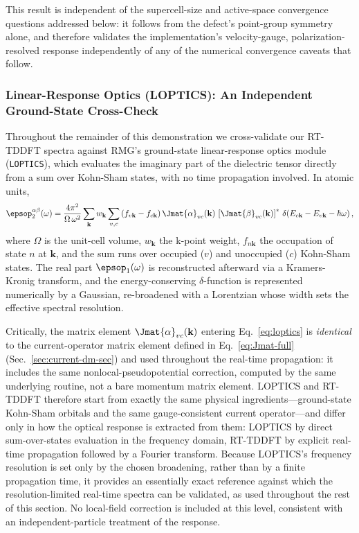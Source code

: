 This result is independent of the supercell-size and active-space
convergence questions addressed below: it follows from the defect's
point-group symmetry alone, and therefore validates the
implementation's velocity-gauge, polarization-resolved response
independently of any of the numerical convergence caveats that follow.

\subsubsection{Linear-Response Optics (LOPTICS): An Independent Ground-State Cross-Check}
\label{sec:nv-loptics}

Throughout the remainder of this demonstration we cross-validate our
RT-TDDFT spectra against RMG's ground-state linear-response optics
module (\texttt{LOPTICS}), which evaluates the imaginary part of the
dielectric tensor directly from a sum over Kohn-Sham states, with no
time propagation involved. In atomic units,
\begin{equation}
  \epsop_2^{\alpha\beta}(\omega) =
  \frac{4\pi^2}{\Omega\,\omega^2}
  \sum_{\mathbf{k}} w_{\mathbf{k}}
  \sum_{v,c}
  \left(f_{v\mathbf{k}} - f_{c\mathbf{k}}\right)
  \Jmat{\alpha}_{vc}(\mathbf{k})\,
  \left[\Jmat{\beta}_{vc}(\mathbf{k})\right]^{*}
  \,\delta\!\left(E_{c\mathbf{k}} - E_{v\mathbf{k}} - \hbar\omega\right),
  \label{eq:loptics}
\end{equation}
where $\Omega$ is the unit-cell volume, $w_{\mathbf{k}}$ the k-point
weight, $f_{n\mathbf{k}}$ the occupation of state $n$ at $\mathbf{k}$,
and the sum runs over occupied ($v$) and unoccupied ($c$) Kohn-Sham
states. The real part $\epsop_1(\omega)$ is reconstructed afterward via
a Kramers-Kronig transform, and the energy-conserving $\delta$-function
is represented numerically by a Gaussian, re-broadened with a
Lorentzian whose width sets the effective spectral resolution.

Critically, the matrix element $\Jmat{\alpha}_{vc}(\mathbf{k})$ entering
Eq.~\eqref{eq:loptics} is \emph{identical} to the current-operator
matrix element defined in Eq.~\eqref{eq:Jmat-full}
(Sec.~\ref{sec:current-dm-sec}) and used throughout the real-time
propagation: it includes the same nonlocal-pseudopotential correction,
computed by the same underlying routine, not a bare momentum matrix
element. LOPTICS and RT-TDDFT therefore start from exactly the same
physical ingredients---ground-state Kohn-Sham orbitals and the same
gauge-consistent current operator---and differ only in how the optical
response is extracted from them: LOPTICS by direct sum-over-states
evaluation in the frequency domain, RT-TDDFT by explicit real-time
propagation followed by a Fourier transform. Because LOPTICS's
frequency resolution is set only by the chosen broadening, rather than
by a finite propagation time, it provides an essentially exact
reference against which the resolution-limited real-time spectra can be
validated, as used throughout the rest of this section. No local-field
correction is included at this level, consistent with an
independent-particle treatment of the response.

